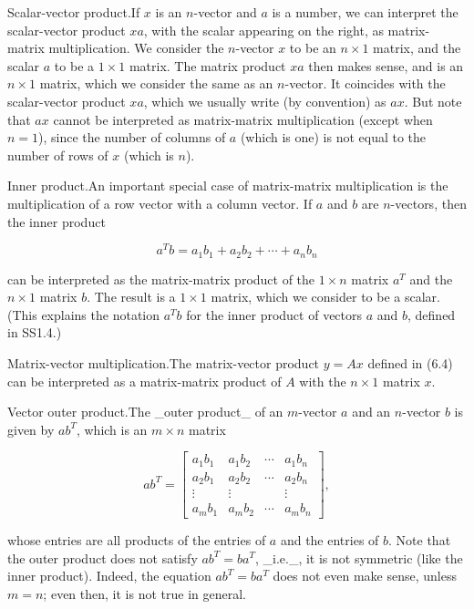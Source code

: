 Scalar-vector product.If \(x\) is an \(n\)-vector and \(a\) is a number, we can interpret the scalar-vector product \(xa\), with the scalar appearing on the right, as matrix-matrix multiplication. We consider the \(n\)-vector \(x\) to be an \(n\times 1\) matrix, and the scalar \(a\) to be a \(1\times 1\) matrix. The matrix product \(xa\) then makes sense, and is an \(n\times 1\) matrix, which we consider the same as an \(n\)-vector. It coincides with the scalar-vector product \(xa\), which we usually write (by convention) as \(ax\). But note that \(ax\) cannot be interpreted as matrix-matrix multiplication (except when \(n=1\)), since the number of columns of \(a\) (which is one) is not equal to the number of rows of \(x\) (which is \(n\)).

Inner product.An important special case of matrix-matrix multiplication is the multiplication of a row vector with a column vector. If \(a\) and \(b\) are \(n\)-vectors, then the inner product

\[a^{T}b=a_{1}b_{1}+a_{2}b_{2}+\cdots+a_{n}b_{n}\]

can be interpreted as the matrix-matrix product of the \(1\times n\) matrix \(a^{T}\) and the \(n\times 1\) matrix \(b\). The result is a \(1\times 1\) matrix, which we consider to be a scalar. (This explains the notation \(a^{T}b\) for the inner product of vectors \(a\) and \(b\), defined in SS1.4.)

Matrix-vector multiplication.The matrix-vector product \(y=Ax\) defined in (6.4) can be interpreted as a matrix-matrix product of \(A\) with the \(n\times 1\) matrix \(x\).

Vector outer product.The _outer product_ of an \(m\)-vector \(a\) and an \(n\)-vector \(b\) is given by \(ab^{T}\), which is an \(m\times n\) matrix

\[ab^{T}=\left[\begin{array}{cccc}a_{1}b_{1}&a_{1}b_{2}&\cdots&a_{1}b_{n}\\ a_{2}b_{1}&a_{2}b_{2}&\cdots&a_{2}b_{n}\\ \vdots&\vdots&&\vdots\\ a_{m}b_{1}&a_{m}b_{2}&\cdots&a_{m}b_{n}\end{array}\right],\]

whose entries are all products of the entries of \(a\) and the entries of \(b\). Note that the outer product does not satisfy \(ab^{T}=ba^{T}\), _i.e._, it is not symmetric (like the inner product). Indeed, the equation \(ab^{T}=ba^{T}\) does not even make sense, unless \(m=n\); even then, it is not true in general.

